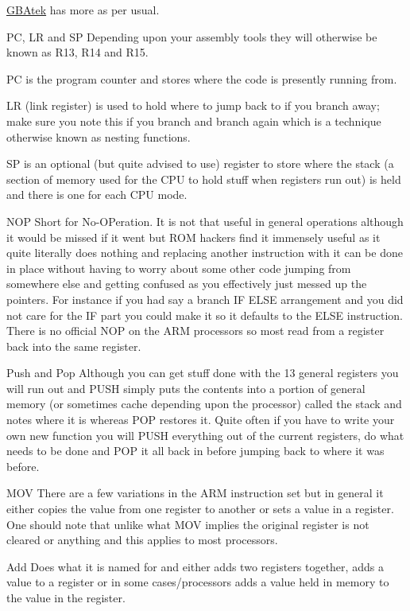 \documentclass[
]{book}
\begin{document}
\href{http://problemkaputt.de/gbatek.htm\#cpuflags}{GBAtek} has more as per usual.

PC, LR and SP Depending upon your assembly tools they will otherwise be known as R13, R14 and R15.

PC is the program counter and stores where the code is presently running from.

LR (link register) is used to hold where to jump back to if you branch away; make sure you note this if you branch and branch again which is a technique otherwise known as nesting functions.

SP is an optional (but quite advised to use) register to store where the stack (a section of memory used for the CPU to hold stuff when registers run out) is held and there is one for each CPU mode.

NOP Short for No-OPeration. It is not that useful in general operations although it would be missed if it went but ROM hackers find it immensely useful as it quite literally does nothing and replacing another instruction with it can be done in place without having to worry about some other code jumping from somewhere else and getting confused as you effectively just messed up the pointers. For instance if you had say a branch IF ELSE arrangement and you did not care for the IF part you could make it so it defaults to the ELSE instruction. There is no official NOP on the ARM processors so most read from a register back into the same register.

Push and Pop Although you can get stuff done with the 13 general registers you will run out and PUSH simply puts the contents into a portion of general memory (or sometimes cache depending upon the processor) called the stack and notes where it is whereas POP restores it. Quite often if you have to write your own new function you will PUSH everything out of the current registers, do what needs to be done and POP it all back in before jumping back to where it was before.

MOV There are a few variations in the ARM instruction set but in general it either copies the value from one register to another or sets a value in a register. One should note that unlike what MOV implies the original register is not cleared or anything and this applies to most processors.

Add Does what it is named for and either adds two registers together, adds a value to a register or in some cases/processors adds a value held in memory to the value in the register.
\end{document}
